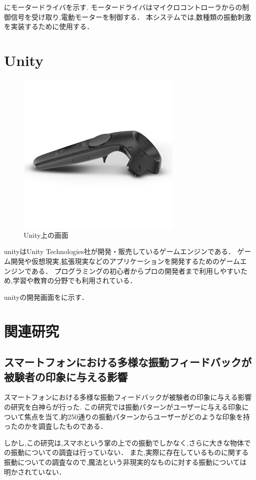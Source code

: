 にモータードライバを示す.
モータードライバはマイクロコントローラからの制御信号を受け取り,電動モーターを制御する．
本システムでは,数種類の振動刺激を実装するために使用する．

\newpage

\section{Unity}

\begin{figure}[h]
\centering
\includegraphics[clip,width=8cm]{./fig/vivecontroller.png}
\caption{Unity上の画面}\label{unity}
\end{figure}

unity\cite{unity}はUnity Technologies社が開発・販売しているゲームエンジンである．
ゲーム開発や仮想現実,拡張現実などのアプリケーションを開発するためのゲームエンジンである．
プログラミングの初心者からプロの開発者まで利用しやすいため,学習や教育の分野でも利用されている．

unityの開発画面をに示す．

\section{関連研究}

\subsection{スマートフォンにおける多様な振動フィードバックが被験者の印象に与える影響}
スマートフォンにおける多様な振動フィードバックが被験者の印象に与える影響\cite{smart}の研究を白神らが行った.
この研究では振動パターンがユーザーに与える印象について焦点を当て,約250通りの振動パターンからユーザーがどのような印象を持ったのかを調査したものである．


しかし,この研究は,スマホという掌の上での振動でしかなく,さらに大きな物体での振動についての調査は行っていない．
また,実際に存在しているものに関する振動についての調査なので,魔法という非現実的なものに対する振動については明かされていない．





